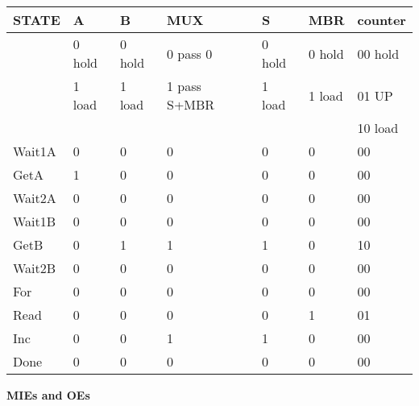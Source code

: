 \begin{enumerate}
\begin{onlysolution}
{                \begin{tabular}{l|l|l|l|l|l|l}
                    STATE & A      & B      &MUX          &S      &MBR    &counter    \\ \hline
                    & 0 hold & 0 hold &0 pass 0     &0 hold &0 hold &00 hold    \\ \hline
                    & 1 load & 1 load &1 pass S+MBR &1 load &1 load &01 UP    \\ \hline
                    &        &        &             &       &       &10 load    \\ \hline
                    Wait1A& 0      & 0      &0            &0      &0      &00    \\ \hline
                    GetA  & 1      & 0      &0            &0      &0      &00    \\ \hline
                    Wait2A& 0      & 0      &0            &0      &0      &00    \\ \hline
                    Wait1B& 0      & 0      &0            &0      &0      &00    \\ \hline
                    GetB  & 0      & 1      &1            &1      &0      &10    \\ \hline
                    Wait2B& 0      & 0      &0            &0      &0      &00    \\ \hline
                    For   & 0      & 0      &0            &0      &0      &00    \\ \hline
                    Read  & 0      & 0      &0            &0      &1      &01    \\ \hline
                    Inc   & 0      & 0      &1            &1      &0      &00    \\ \hline
                    Done  & 0      & 0      &0            &0      &0      &00    \\
                \end{tabular}

                \textbf{ MIEs and OEs}

}
\end{onlysolution}
\end{enumerate}

